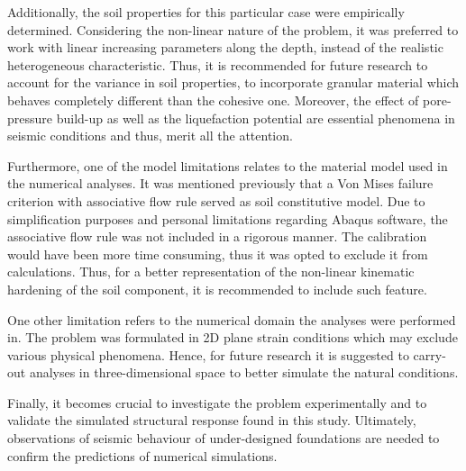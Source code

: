 Additionally, the soil properties for this particular case were empirically determined. Considering the non-linear nature of the problem, it was preferred to work with linear increasing parameters along the depth, instead of the realistic heterogeneous characteristic. Thus, it is recommended for future research to account for the variance in soil properties, to incorporate granular material which behaves completely different than the cohesive one. Moreover, the effect of pore-pressure build-up as well as the liquefaction potential are essential phenomena in seismic conditions and thus, merit all the attention.

Furthermore, one of the model limitations relates to the material model used in the numerical analyses. It was mentioned previously that a Von Mises failure criterion with associative flow rule served as soil constitutive model. Due to simplification purposes and personal limitations regarding Abaqus software, the associative flow rule was not included in a rigorous manner. The calibration would have been more time consuming, thus it was opted to exclude it from calculations. Thus, for a better representation of the non-linear kinematic hardening of the soil component, it is recommended to include such feature.

One other limitation refers to the numerical domain the analyses were performed in. The problem was formulated in 2D plane strain conditions which may exclude various physical \mbox{phenomena}. Hence, for future research it is suggested to carry-out analyses in three-dimensional space to better simulate the natural conditions. 

Finally, it becomes crucial to investigate the problem experimentally and to validate the simulated structural response found in this study. Ultimately, observations of seismic behaviour of under-designed foundations are needed to confirm the predictions of numerical simulations.



